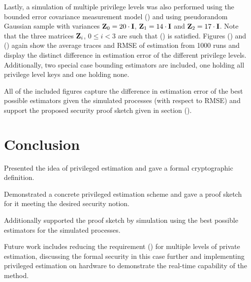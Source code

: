 \documentclass[letterpaper, 10 pt, conference]{IEEEtran}
\theoremstyle{definition}
\theoremstyle{definition}
\theoremstyle{remark}
\begin{document}
Lastly, a simulation of multiple privilege levels was also performed using the bounded error covariance measurement model () and using pseudorandom Gaussian sample with variances ${{\mathbf{Z}}}_0=20 \cdot {\ensuremath{{\mathbf{I}}}}$, ${{\mathbf{Z}}}_1=14 \cdot {\ensuremath{{\mathbf{I}}}}$ and ${{\mathbf{Z}}}_2=17 \cdot {\ensuremath{{\mathbf{I}}}}$. Note that the three matrices ${{\mathbf{Z}}}_i$, $0 \leq i < 3$ are such that () is satisfied. Figures () and () again show the average traces and RMSE of estimation from 1000 runs and display the distinct difference in estimation error of the different privilege levels. Additionally, two special case bounding estimators are included, one holding all privilege level keys and one holding none.


All of the included figures capture the difference in estimation error of the best possible estimators given the simulated processes (with respect to RMSE) and support the proposed security proof sketch given in section ().

% 
%                                               
%                                               
%                                               
% 

\section{Conclusion}\label{sec:conclusion}
Presented the idea of privileged estimation and gave a formal cryptographic definition.

Demonstrated a concrete privileged estimation scheme and gave a proof sketch for it meeting the desired security notion.

Additionally supported the proof sketch by simulation using the best possible estimators for the simulated processes.

Future work includes reducing the requirement () for multiple levels of private estimation, discussing the formal security in this case further and implementing privileged estimation on hardware to demonstrate the real-time capability of the method.






\end{document}
